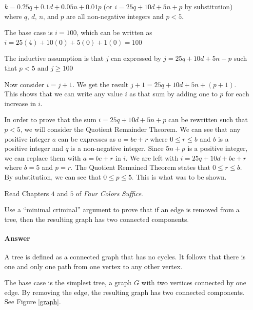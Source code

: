 \documentclass{article}
\begin{document}
$k = 0.25q + 0.1d + 0.05n + 0.01p$ (or $i = 25q + 10d + 5n + p$ by substitution)
where $q$, $d$, $n$, and $p$ are all non-negative integers and $p<5$.

The base case is $i = 100$, which can be written as $i = 25(4) + 10(0) + 5(0) + 1(0) = 100$

The inductive assumption is that $j$ can expressed by $j = 25q + 10d + 5n + p$ such that $p<5$ and $j \geq 100$

Now consider $i=j+1$. We get the result $j+1 = 25q + 10d +5n + (p+1)$. This shows that we can write any value 
$i$ as that sum by adding one to $p$ for each increase in $i$.

In order to prove that the sum $i = 25q + 10d + 5n + p$ can be rewritten such that $p<5$, we will consider the Quotient Remainder Theorem.
We can see that any positive integer $a$ can be expresses as $a = bc + r$ where $0 \leq r \leq b$ and $b$ is a positive integer and $q$ is a non-negative integer.
Since $5n+p$ is a positive integer, we can replace them with $a=bc+r$ in $i$. We are left with  $i = 25q + 10d + bc+r$ where $b=5$ and $p=r$. 
The Quotient Remained Theorem states that $0 \leq r \leq b$. By substitution, we can see that $0 \leq p \leq 5$. This is what was to be shown.


 

Read Chapters $4$ and $5$ of \emph{Four Colors Suffice}.

Use a ``minimal criminal'' argument to prove that if an edge is removed from a
tree, then the resulting graph has two connected components.

        \paragraph{Answer}

	A tree is defined as a connected graph that has no cycles. It follows that there is one and only one path from one vertex to any other vertex.
	
	The base case is the simplest tree, a graph $G$ with two vertices connected by one edge. By removing the edge, the resulting graph has two connected components. See Figure \ref{graph}.
	
\end{document}
